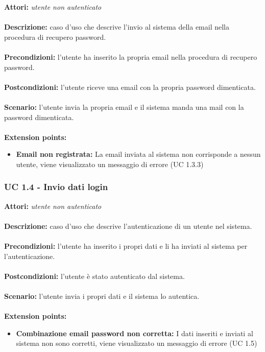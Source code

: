 \documentclass[a4paper,11pt]{article}
\begin{document}

\textbf{Attori:} \textit{utente non autenticato}
\\ \\
\textbf{Descrizione:} caso d'uso che descrive l'invio al sistema della email nella procedura di recupero password.\\
\\
\textbf{Precondizioni:} l'utente ha inserito la propria email nella procedura di recupero password.\\
\\
\textbf{Postcondizioni:} l’utente riceve una email con la propria password dimenticata.\\
\\
\textbf{Scenario:} l’utente invia la propria email e il sistema manda una mail con la password dimenticata.\\
\\
\textbf{Extension points:} 
\begin{itemize}
	\item \textbf{Email non registrata:} La email inviata al sistema non corrisponde a nessun utente, viene visualizzato un messaggio di errore (UC 1.3.3)
\end{itemize}


\subsubsection{UC 1.4 - Invio dati login}

\textbf{Attori:} \textit{utente non autenticato}
\\ \\
\textbf{Descrizione:} caso d'uso che descrive l'autenticazione di un utente nel sistema.\\
\\
\textbf{Precondizioni:} l'utente ha inserito i propri dati e li ha inviati al sistema per l'autenticazione.\\
\\
\textbf{Postcondizioni:} l’utente è stato autenticato dal sistema.\\
\\
\textbf{Scenario:} l’utente invia i propri dati e il sistema lo autentica.\\
\\
\textbf{Extension points:} 
\begin{itemize}
	\item \textbf{Combinazione email password non corretta:} I dati inseriti e inviati al sistema non sono corretti, viene visualizzato un messaggio di errore (UC 1.5)
\end{itemize}
\end{document}
